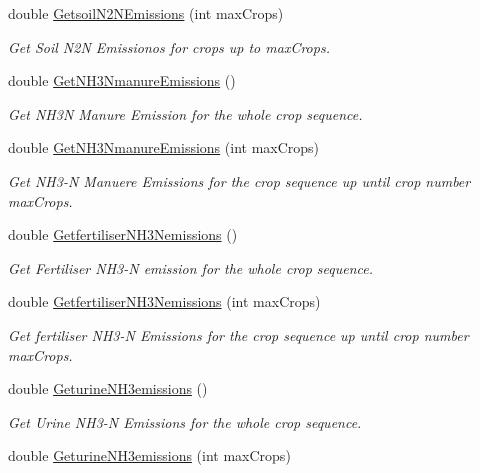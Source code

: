 \begin{DoxyCompactItemize}
double \mbox{\hyperlink{class_crop_sequence_class_aad5858d480c48cb5675a96d8a5e95e80}{Getsoil\+N2\+N\+Emissions}} (int max\+Crops)
\begin{DoxyCompactList}\small\item\em Get Soil N2N Emissionos for crops up to max\+Crops. \end{DoxyCompactList}\item 
double \mbox{\hyperlink{class_crop_sequence_class_ae6d531161720a04116b3bff390c6c51e}{Get\+N\+H3\+Nmanure\+Emissions}} ()
\begin{DoxyCompactList}\small\item\em Get N\+H3N Manure Emission for the whole crop sequence. \end{DoxyCompactList}\item 
double \mbox{\hyperlink{class_crop_sequence_class_a7f13a7bbf89986c17605e4df01576abf}{Get\+N\+H3\+Nmanure\+Emissions}} (int max\+Crops)
\begin{DoxyCompactList}\small\item\em Get N\+H3-\/N Manuere Emissions for the crop sequence up until crop number max\+Crops. \end{DoxyCompactList}\item 
double \mbox{\hyperlink{class_crop_sequence_class_ac9bf920b027d33d0ebc1d1a43e1b713e}{Getfertiliser\+N\+H3\+Nemissions}} ()
\begin{DoxyCompactList}\small\item\em Get Fertiliser N\+H3-\/N emission for the whole crop sequence. \end{DoxyCompactList}\item 
double \mbox{\hyperlink{class_crop_sequence_class_a61ef6bc1ddc06e99da8951319e1082d9}{Getfertiliser\+N\+H3\+Nemissions}} (int max\+Crops)
\begin{DoxyCompactList}\small\item\em Get fertiliser N\+H3-\/N Emissions for the crop sequence up until crop number max\+Crops. \end{DoxyCompactList}\item 
double \mbox{\hyperlink{class_crop_sequence_class_a8016dda941183a9d6c82e843be2016c4}{Geturine\+N\+H3emissions}} ()
\begin{DoxyCompactList}\small\item\em Get Urine N\+H3-\/N Emissions for the whole crop sequence. \end{DoxyCompactList}\item 
double \mbox{\hyperlink{class_crop_sequence_class_a860cad5b4e23c37dee4bd95ecf59ffd5}{Geturine\+N\+H3emissions}} (int max\+Crops)

\end{DoxyCompactItemize}
